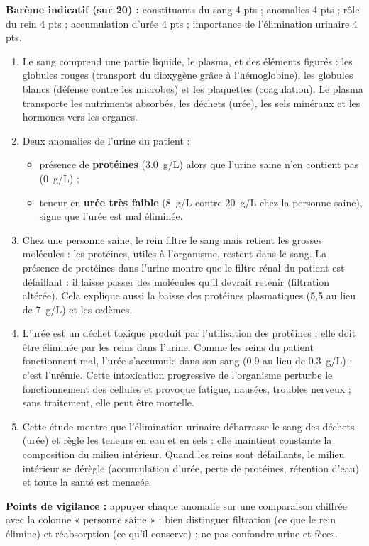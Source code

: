 \documentclass[11pt]{article}
\newcommand{\cle}[1]{{\popxbold\color{popdark}#1}}
\begin{document}
\begin{corrige}
\textbf{Barème indicatif (sur 20) :} constituants du sang 4 pts ; anomalies 4 pts ; rôle du rein 4 pts ; accumulation d'urée 4 pts ; importance de l'élimination urinaire 4 pts.

\begin{enumerate}
\item Le sang comprend une partie liquide, le \cle{plasma}, et des éléments figurés : les \cle{globules rouges} (transport du dioxygène grâce à l'hémoglobine), les \cle{globules blancs} (défense contre les microbes) et les \cle{plaquettes} (coagulation). Le plasma transporte les nutriments absorbés, les déchets (urée), les sels minéraux et les hormones vers les organes.
\item Deux anomalies de l'urine du patient :
\begin{itemize}
\item présence de \textbf{protéines} (\SI{3,0}{g/L}) alors que l'urine saine n'en contient pas (\SI{0}{g/L}) ;
\item teneur en \textbf{urée très faible} (\SI{8}{g/L} contre \SI{20}{g/L} chez la personne saine), signe que l'urée est mal éliminée.
\end{itemize}
\item Chez une personne saine, le rein filtre le sang mais retient les grosses molécules : les protéines, utiles à l'organisme, restent dans le sang. La présence de protéines dans l'urine montre que le filtre rénal du patient est défaillant : il laisse passer des molécules qu'il devrait retenir (\cle{filtration} altérée). Cela explique aussi la baisse des protéines plasmatiques (5,5 au lieu de \SI{7}{g/L}) et les \oe dèmes.
\item L'urée est un déchet toxique produit par l'utilisation des protéines ; elle doit être éliminée par les reins dans l'urine. Comme les reins du patient fonctionnent mal, l'urée s'accumule dans son sang (0,9 au lieu de \SI{0,3}{g/L}) : c'est l'\cle{urémie}. Cette intoxication progressive de l'organisme perturbe le fonctionnement des cellules et provoque fatigue, nausées, troubles nerveux ; sans traitement, elle peut être mortelle.
\item Cette étude montre que l'élimination urinaire débarrasse le sang des déchets (urée) et règle les teneurs en eau et en sels : elle maintient constante la composition du milieu intérieur. Quand les reins sont défaillants, le milieu intérieur se dérègle (accumulation d'urée, perte de protéines, rétention d'eau) et toute la santé est menacée.
\end{enumerate}
\textbf{Points de vigilance :} appuyer chaque anomalie sur une comparaison chiffrée avec la colonne « personne saine » ; bien distinguer filtration (ce que le rein élimine) et réabsorption (ce qu'il conserve) ; ne pas confondre urine et fèces.
\end{corrige}
\end{document}
